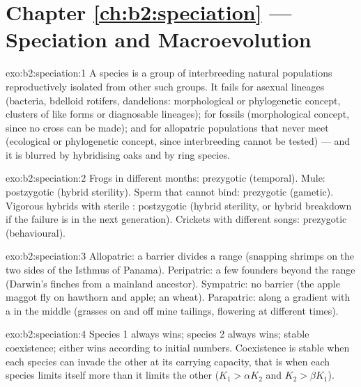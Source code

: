 \section*{Chapter \ref{ch:b2:speciation} --- Speciation and Macroevolution}

\begin{solution}{exo:b2:speciation:1}
A species is a group of interbreeding natural populations
reproductively isolated from other such groups. It fails for
asexual lineages (bacteria, bdelloid rotifers, dandelions:
morphological or phylogenetic concept, clusters of like forms or
diagnosable lineages); for fossils (morphological concept, since
no cross can be made); and for allopatric populations that never
meet (ecological or phylogenetic concept, since interbreeding
cannot be tested) --- and it is blurred by hybridising oaks and by
ring species.
\end{solution}

\begin{solution}{exo:b2:speciation:2}
Frogs in different months: prezygotic (temporal). Mule: postzygotic
(hybrid sterility). Sperm that cannot bind: prezygotic (gametic).
Vigorous hybrids with sterile : postzygotic (hybrid sterility,
or hybrid breakdown if the failure is in the next generation).
Crickets with different songs: prezygotic (behavioural).
\end{solution}

\begin{solution}{exo:b2:speciation:3}
Allopatric: a barrier divides a range (snapping shrimps on the two
sides of the Isthmus of Panama). Peripatric: a few founders beyond
the range (Darwin's finches from a mainland ancestor). Sympatric:
no barrier (the apple maggot fly on hawthorn and apple; an
 wheat). Parapatric: along a gradient with a  in the middle (grasses on and off mine tailings, flowering at
different times).
\end{solution}

\begin{solution}{exo:b2:speciation:4}
Species 1 always wins; species 2 always wins; stable coexistence;
either wins according to initial numbers. Coexistence is stable
when each species can invade the other at its carrying capacity,
that is when each species limits itself more than it limits the
other ($K_1 > \alpha K_2$ and $K_2 > \beta K_1$).
\end{solution}

